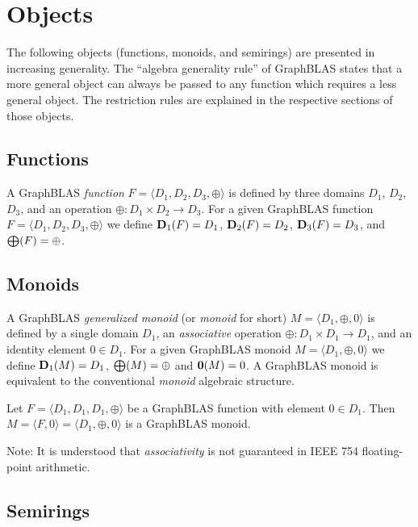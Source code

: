 \section{Objects}

The following objects (functions, monoids, and semirings) are presented in increasing generality.
The ``algebra generality rule'' of GraphBLAS states that a more general object can always be passed to
any function which requires a less general object. The restriction rules are explained in the respective sections of those objects.

\subsection{Functions}

A GraphBLAS \emph{function} $F = \langle D_1,D_2,D_3,\oplus \rangle$
is defined by three domains $D_1$, $D_2$, $D_3$, and an operation
$\oplus: D_1 \times D_2 \rightarrow D_3$.  For a given GraphBLAS function
$F=\langle D_1, D_2, D_3,\oplus \rangle$ we define $\bold{D}_1(F) = D_1$,
$\bold{D}_2(F) = D_2$, $\bold{D}_3(F) = D_3$, and $\bold{\bigoplus}(F)
= \oplus$.

\subsection{Monoids}

A GraphBLAS \emph{generalized monoid} (or \emph{monoid} for short) $M =
\langle D_1,\oplus,0 \rangle$ is defined by a single domain $D_1$, an 
\emph{associative} operation $\oplus: D_1 \times D_1 \rightarrow D_1$,
and an identity element $0 \in D_1$.  For a given GraphBLAS monoid $M=\langle
D_1,\oplus,0 \rangle$ we define $\bold{D}_1(M) = D_1$, $\bold{\bigoplus}(M) =
\oplus$ and $\bold{0}(M) = 0$.  A GraphBLAS monoid is equivalent to 
the conventional \emph{monoid} algebraic structure.

Let $F = \langle D_1,D_1,D_1,\oplus \rangle$ be a GraphBLAS function
with element $0 \in D_1$.  Then $M = \langle F,0 \rangle = \langle
D_1,\oplus,0 \rangle$ is a GraphBLAS monoid.

Note: It is understood that \emph{associativity} is not guaranteed in IEEE 754 floating-point arithmetic.  

\subsection{Semirings}

